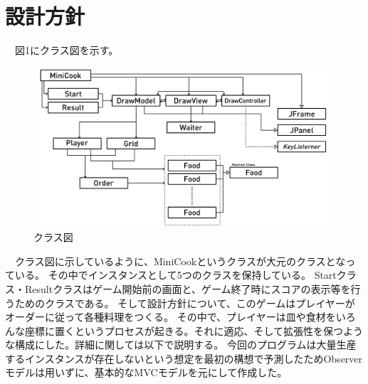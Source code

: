 \documentclass[a4j]{jsarticle} %
\begin{document}
\section{設計方針}
　図1にクラス図を示す。%
\begin{figure}[H]
  \begin{center}
  \includegraphics[width = 135mm]{img/class_graph.png}
  \caption{クラス図}
  \end{center}
\end{figure}
　クラス図に示しているように、MiniCookというクラスが大元のクラスとなっている。
その中でインスタンスとして5つのクラスを保持している。
Startクラス・Resultクラスはゲーム開始前の画面と、ゲーム終了時にスコアの表示等を行うためのクラスである。
そして設計方針について、このゲームはプレイヤーがオーダーに従って各種料理をつくる。
その中で、プレイヤーは皿や食材をいろんな座標に置くというプロセスが起きる。それに適応、そして拡張性を保つような構成にした。詳細に関しては以下で説明する。
今回のプログラムは大量生産するインスタンスが存在しないという想定を最初の構想で予測したためObserverモデルは用いずに、基本的なMVCモデルを元にして作成した。
\end{document}
